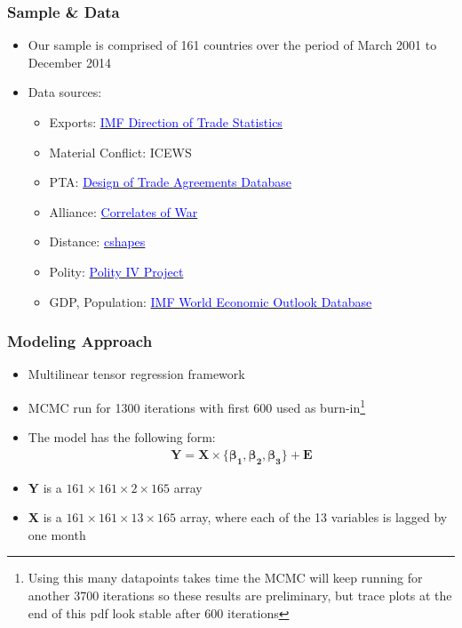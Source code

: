 \documentclass[10pt, compress]{beamer}
\begin{document}
\frame
{
  \frametitle{Sample \& Data}
  \begin{itemize}
  \item  Our sample is comprised of 161 countries over the period of March 2001 to December 2014
  \item Data sources:
  \begin{itemize}
    \item Exports: \href{http://data.imf.org/?sk=8aa6eb7c-598b-4d3b-82f4-adab95d23145&dsId=DS_1414779485682}{\textcolor{blue}{IMF Direction of Trade Statistics}}
    \item Material Conflict: ICEWS
    \item PTA: \href{http://www.designoftradeagreements.org/}{\textcolor{blue}{Design of Trade Agreements Database}}
    \item Alliance: \href{http://www.correlatesofwar.org/news/alliances-data-set-v4-1-available-1}{\textcolor{blue}{Correlates of War}}
    \item Distance: \href{http://nils.weidmann.ws/projects/cshapes}{\textcolor{blue}{cshapes}}
    \item Polity: \href{http://www.systemicpeace.org/polity/polity4.htm}{\textcolor{blue}{Polity IV Project}}
    \item GDP, Population: \href{https://www.imf.org/external/pubs/ft/weo/2014/02/weodata/index.aspx}{\textcolor{blue}{IMF World Economic Outlook Database}}
  \end{itemize}
  \end{itemize}    
} 

\frame
{
  \frametitle{Modeling Approach}
  \begin{itemize}
  \item Multilinear tensor regression framework
  \item MCMC run for 1300 iterations with first 600 used as burn-in\footnote{Using this many datapoints takes time the MCMC will keep running for another 3700 iterations so these results are preliminary, but trace plots at the end of this pdf look stable after 600 iterations}
  \item The model has the following form:
  \begin{align*}
  \textbf{Y} = \textbf{X} \times \{\boldsymbol{\beta_{1}}, \boldsymbol{\beta_{2}}, \boldsymbol{\beta_{3}} \} + \textbf{E}
  \end{align*}
  \item \textbf{Y} is a $161 \times 161 \times 2 \times 165$ array
  \item \textbf{X} is a $161 \times 161 \times 13 \times 165$ array, where each of the 13 variables is lagged by one month
  \end{itemize}    
} 
\end{document}

